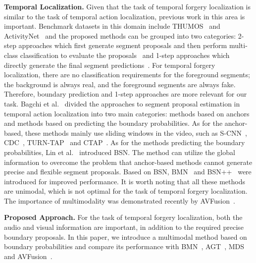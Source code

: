 \documentclass[conference, a4paper]{IEEEtran}
\begin{document}
\noindent \textbf{Temporal Localization.} Given that the task of temporal forgery localization is similar to the task of temporal action localization, previous work in this area is important. Benchmark datasets in this domain include THUMOS~\cite{idrees_thumos_2017} and ActivityNet~\cite{caba_heilbron_activitynet_2015} and the proposed methods can be grouped into two categories: 2-step approaches which first generate segment proposals and then perform multi-class classification to evaluate the proposals~\cite{zeng_graph_2019, xu_g-tad_2020, liu_multi-shot_2021} and 1-step approaches which directly generate the final segment predictions~\cite{lin_single_2017,buch_end--end_2019,nawhal_activity_2021}. For temporal forgery localization, there are no classification requirements for the foreground segments; the background is always real, and the foreground segments are always fake. Therefore, boundary prediction and 1-step approaches are more relevant for our task. Bagchi et al.~\cite{bagchi_hear_2021} divided the approaches to segment proposal estimation in temporal action localization into two main categories: methods based on anchors and methods based on predicting the boundary probabilities. As for the anchor-based, these methods mainly use sliding windows in the video, such as S-CNN~\cite{shou_temporal_2016}, CDC~\cite{shou_cdc_2017}, TURN-TAP~\cite{gao_turn_2017} and CTAP~\cite{gao_ctap_2018}. As for the methods predicting the boundary probabilities, Lin et al.~\cite{lin_bsn_2018} introduced BSN. The method can utilize the global information to overcome the problem that anchor-based methods cannot generate precise and flexible segment proposals. Based on BSN, BMN~\cite{lin_bmn_2019} and BSN++~\cite{su_bsn_2021} were introduced for improved performance. It is worth noting that all these methods are unimodal, which is not optimal for the task of temporal forgery localization. The importance of multimodality was demonstrated recently by AVFusion~\cite{bagchi_hear_2021}.
    
\noindent \textbf{Proposed Approach.} For the task of temporal forgery localization, both the audio and visual information are important, in addition to the required precise boundary proposals. In this paper, we introduce a multimodal method based on boundary probabilities and compare its performance with BMN~\cite{lin_bmn_2019}, AGT~\cite{nawhal_activity_2021}, MDS~\cite{chugh_not_2020} and AVFusion~\cite{bagchi_hear_2021}.
\end{document}

